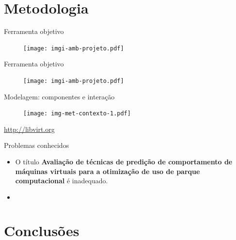 \documentclass{beamer}
\begin{document}
\section{Metodologia}

\begin{frame}{Ferramenta objetivo}
\begin{figure}
\centering
\texttt{[image: imgi-amb-projeto.pdf]}
\end{figure}
\end{frame}

\begin{frame}{Ferramenta objetivo}
\begin{figure}
\centering
\texttt{[image: imgi-amb-projeto.pdf]}
\end{figure}
\end{frame}

\begin{frame}{Modelagem: componentes e interação}
\begin{figure}
\centering
\texttt{[image: img-met-contexto-1.pdf]}
\end{figure}
\tiny{\url{http://libvirt.org}}
\end{frame}

\begin{frame}{Problemas conhecidos}
\begin{itemize}
  \item O título \textbf{Avaliação de técnicas de predição de comportamento
        de máquinas virtuais para a otimização de uso de parque computacional} é
        inadequado.
  \item 
\end{itemize}
\end{frame}

\section{Conclusões}
\end{document}
